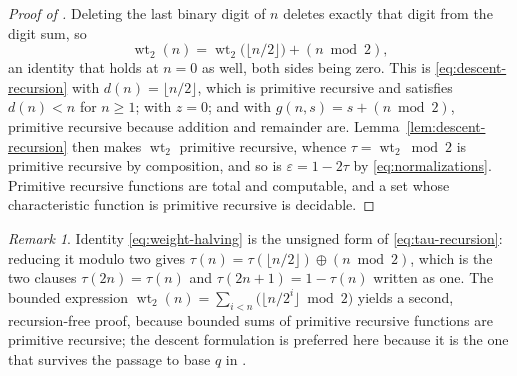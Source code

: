 \documentclass[11pt,oneside]{article}
\numberwithin{equation}{section}
\theoremstyle{definition}
\theoremstyle{remark}
\newtheorem{remark}[theorem]{Remark}
\newcommand{\wt}{\operatorname{wt}_2}
\newcommand{\eps}{\varepsilon}
\newcommand{\xor}{\mathbin{\oplus}}
\begin{document}
\begin{proof}[Proof of ]
Deleting the last binary digit of \(n\) deletes exactly that digit from
the digit sum, so
\begin{equation}
  \wt(n)=\wt\bigl(\lfloor n/2\rfloor\bigr)+(n\bmod2),
  \label{eq:weight-halving}
\end{equation}
an identity that holds at \(n=0\) as well, both sides being zero.  This
is \eqref{eq:descent-recursion} with \(d(n)=\lfloor n/2\rfloor\),
which is primitive recursive and satisfies \(d(n)<n\) for \(n\ge1\);
with \(z=0\); and with \(g(n,s)=s+(n\bmod2)\), primitive recursive
because addition and remainder are.  Lemma~\ref{lem:descent-recursion} then
makes \(\wt\) primitive recursive, whence \(\tau=\wt\bmod2\) is
primitive recursive by composition, and so is \(\eps=1-2\tau\) by
\eqref{eq:normalizations}.  Primitive recursive functions are total and
computable, and a set whose characteristic function is primitive recursive
is decidable.
\end{proof}

\begin{remark}
Identity \eqref{eq:weight-halving} is the unsigned form of
\eqref{eq:tau-recursion}: reducing it modulo two gives
\(\tau(n)=\tau(\lfloor n/2\rfloor)\xor(n\bmod2)\), which is the two
clauses \(\tau(2n)=\tau(n)\) and \(\tau(2n+1)=1-\tau(n)\) written as
one.  The bounded expression
\(\wt(n)=\sum_{i<n}\bigl(\lfloor n/2^i\rfloor\bmod2\bigr)\) yields a
second, recursion-free proof, because bounded sums of primitive recursive
functions are primitive recursive; the descent formulation is preferred
here because it is the one that survives the passage to base \(q\) in
.
\end{remark}
\end{document}
